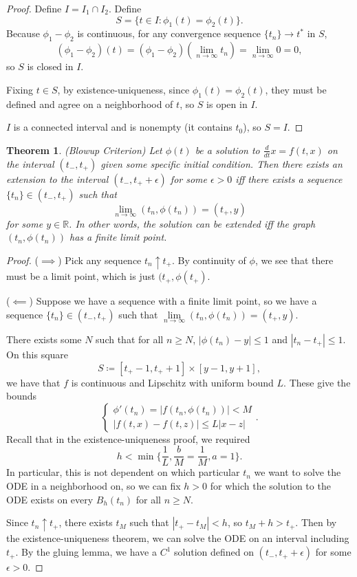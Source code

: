 \documentclass{tufte-handout}
\newcommand*\R{\mathbb{R}}
\newtheorem{thm}{Theorem}[subsection]
\theoremstyle{definition}
\begin{document}
\begin{proof}
	Define $I = I_1 \cap I_2$. Define \[
		S = \{t \in I : \phi_1(t) = \phi_2(t)\}
	.\] Because $\phi_1 - \phi_2$ is continuous, for any convergence sequence $\{t_n\} \to t^*$ in $S$, \[
		\left( \phi_1-\phi_2 \right)(t) = (\phi_1-\phi_2) (\lim\limits_{n \to \infty} t_n) = \lim\limits_{n \to \infty} 0 = 0
	,\] so $S$ is closed in $I$.

	Fixing $t \in S$, by existence-uniqueness, since $\phi_1(t) = \phi_2(t)$, they must be defined and agree on a neighborhood of $t$, so $S$ is open in $I$.

	$I$ is a connected interval and is nonempty (it contains $t_0$), so $S=I$.
\end{proof}

\begin{thm}
	(Blowup Criterion) Let $\phi(t)$ be a solution to $\frac{d}{dt}x = f(t,x)$ on the interval $(t_-, t_+)$ given some specific initial condition. Then there exists an extension to the interval $(t_-, t_+ + \epsilon)$ for some $\epsilon > 0$ iff there exists a sequence $\{t_n\} \in (t_-, t_+)$ such that \[
		\lim\limits_{n \to \infty} \left( t_n, \phi(t_n) \right) = (t_+, y)
	\] for some $y \in \R$. In other words, the solution can be extended iff the graph $(t_n, \phi(t_n))$ has a finite limit point.
\end{thm}

\begin{proof}
	($\implies$) Pick any sequence $t_n \uparrow t_+$. By continuity of $\phi$, we see that there must be a limit point, which is just $(t_+, \phi(t_+)$.

	($\impliedby$) Suppose we have a sequence with a finite limit point, so we have a sequence $\{t_n\} \in (t_-, t_+)$ such that $\lim\limits_{n \to \infty} (t_n, \phi(t_n)) = (t_+, y)$.

	There exists some $N$ such that for all $n \ge N$, $\left| \phi(t_n) - y \right| \le 1$ and $\left| t_n - t_+ \right| \le 1$. On this square \[
		S\coloneqq \left[ t_+ - 1, t_+ +1 \right]\times \left[ y-1,y+1 \right]
	,\] we have that $f$ is continuous and Lipschitz with uniform bound $L$. These give the bounds \[
		\begin{cases}
			\phi'(t_n) = \left| f(t_n, \phi(t_n)) \right| < M \\
			\left| f(t, x) - f(t, z) \right|\le L \left| x-z \right|
		\end{cases}
	.\] Recall that in the existence-uniqueness proof, we required \[
		h < \min \{\frac{1}{L}, \frac{b}{M} = \frac{1}{M}, a = 1\}
	.\] In particular, this is not dependent on which particular $t_n$ we want to solve the ODE in a neighborhood on, so we can fix $h > 0$ for which the solution to the ODE exists on every $B_h(t_n)$ for all $n \ge N$.

	Since $t_n \uparrow t_+$, there exists $t_M$ such that $\left| t_+ - t_M \right| < h$, so $t_M + h > t_+$. Then by the existence-uniqueness theorem, we can solve the ODE on an interval including $t_+$. By the gluing lemma, we have a $C^1$ solution defined on $(t_-, t_+ + \epsilon)$ for some $\epsilon > 0 $.

\end{proof}
\end{document}
